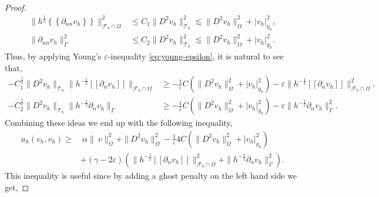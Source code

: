 \documentclass[11pt]{article}
\theoremstyle{remark}
\newcommand{\mean}[1]{\left\{\!\!\left\{#1\right\}\!\!\right\}}
\newcommand{\jump}[1]{\left[\!\left[ #1 \right]\!\right]}
\newcommand{\abs}[1]{\left\lvert #1 \right\rvert}
\renewcommand{\le}{\leqslant}
\renewcommand{\ge}{\geqslant}
\numberwithin{equation}{section}
\begin{document}
\begin{proof}
    \begin{equation}
        \begin{split}
     \| h^{\frac{1}{2}} \mean{ \partial _{nn}v_{h} } \|_{ \mathcal{F}_{h} \cap \Omega    }^{  2} & \le C_{1} \| D^2 v_{h} \|_{ \mathcal{T}_{h}   }^{2  } \lesssim   \| D^2 v_{h} \|_{ \Omega  }^{ 2 }  + \abs{ v_{h} } _{ g_{h} }^{2  },   \\
     \|  \partial _{nn}v_{h}  \|_{ \Gamma     }^{ 2 } & \le C_{2} \| D^2 v_{h} \|_{ \mathcal{T} _{h}  }^{2  } \lesssim    \| D^2 v_{h} \|_{ \Omega  }^{ 2 }  + \abs{ v_{h} } _{ g_{h} }^{2  }.
        \end{split}
    \end{equation}
    Thus, by applying Young's $\varepsilon $-inequality \eqref{eq:young-epsilon}, it is natural to see that,
    \begin{equation}
        \begin{split}
- C_{1}^{\frac{1}{2}} \| D^2 v_{h}    \|_{ \mathcal{T} _{h}   }^{  }  \|h^{-\frac{1}{2}} \jump{ \partial _{n} v_{h} }   \|_{ \mathcal{F}^{}_{h}\cap \Omega   }^{  }
& \ge - \frac{1}{\varepsilon } C  (\| D^2 v_{h} \|_{ \Omega  }^{ 2 }  + \abs{ v_{h} } _{ g_{h} }^{2  } ) -  \varepsilon \|h^{-\frac{1}{2}} \jump{ \partial _{n} v_{h} }   \|_{ \mathcal{F}^{}_{h}\cap \Omega   }^{2  }, \\
- C_{2}^{\frac{1}{2}}  \| D^2 v_{h} \|_{ \mathcal{T} _{h} }^{  } \| h^{-\frac{1}{2}}  \partial _{n} v_{h}    \|_{ \Gamma    }^{  }
& \ge - \frac{1}{\varepsilon } C  (\| D^2 v_{h} \|_{ \Omega  }^{ 2 }  + \abs{ v_{h} } _{ g_{h} }^{2  } ) -  \varepsilon \|h^{-\frac{1}{2}}  \partial _{n} v_{h}    \|_{ \Gamma    }^{2  }.
        \end{split}
    \end{equation}
    Combining these ideas we end up with the following inequality,
    \begin{equation}
    \begin{split}
       a_{h}( v_{h},v_{h})  \ge& \  \alpha     \|\  v  \|_{   \Omega   }^{2} +\| D^2v_{h}  \|_{   \Omega   }^{2} -  \frac{1}{\varepsilon } 4C  (\| D^2 v_{h} \|_{ \Omega  }^{ 2 }  + \abs{ v_{h} } _{ g_{h} }^{2  } )  \\
                       & + (\gamma - 2\varepsilon  )\left( \|h^{-\frac{1}{2}}  \jump{ \partial _{n} v_{h} }\|_{\mathcal{F} _{h}^{} \cap \Omega   }^{ 2 } + \| h^{-\frac{1}{2}} \partial _{n} v_{h} \|_{ \Gamma  }^{ 2} \right).
    \end{split}
    \end{equation}
    This inequality is useful since by adding a ghost penalty on the left hand side we get,

\end{proof}
\end{document}
